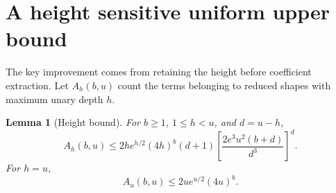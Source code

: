 \documentclass[11pt,a4paper]{article}
\numberwithin{equation}{section}
\newtheorem{lemma}[theorem]{Lemma}
\theoremstyle{remark}
\begin{document}
\section{A height sensitive uniform upper bound}\label{lam:ao:sec:height}
The key improvement comes from retaining the height before coefficient extraction. Let $A_h(b,u)$ count the terms belonging to reduced shapes with maximum unary depth $h$.
\begin{lemma}[Height bound]\label{lam:ao:lem:height}
For $b\ge1$, $1\le h<u$, and $d=u-h$,
\begin{equation}\label{lam:ao:eq:heightbound}
 A_h(b,u)\le2h e^{h/2}(4h)^b(d+1)
                  \left[\frac{2e^3u^2(b+d)}{d^3}\right]^d.
\end{equation}
For $h=u$,
\begin{equation}\label{lam:ao:eq:heightzero}
 A_u(b,u)\le2u e^{u/2}(4u)^b.
\end{equation}
\end{lemma}
\end{document}
